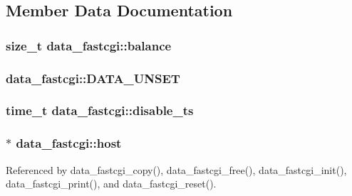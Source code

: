 \subsection{Member Data Documentation}
\hypertarget{structdata__fastcgi_ac4067fab3724bebefa875ef166c87d40}{
\subsubsection[{balance}]{\setlength{\rightskip}{0pt plus 5cm}size\-\_\-t data\-\_\-fastcgi\-::balance}}\label{structdata__fastcgi_ac4067fab3724bebefa875ef166c87d40}
\hypertarget{structdata__fastcgi_a5d6f1b6fd91e51aaf69a762ae91fc3a9}{
\subsubsection[{D\-A\-T\-A\-\_\-\-U\-N\-S\-E\-T}]{\setlength{\rightskip}{0pt plus 5cm}data\-\_\-fastcgi\-::\-D\-A\-T\-A\-\_\-\-U\-N\-S\-E\-T}}\label{structdata__fastcgi_a5d6f1b6fd91e51aaf69a762ae91fc3a9}
\hypertarget{structdata__fastcgi_a577cc4369a25513332564a46ba2657c7}{
\subsubsection[{disable\-\_\-ts}]{\setlength{\rightskip}{0pt plus 5cm}time\-\_\-t data\-\_\-fastcgi\-::disable\-\_\-ts}}\label{structdata__fastcgi_a577cc4369a25513332564a46ba2657c7}
\hypertarget{structdata__fastcgi_a7a9c24ab4f5ac9adad30f456386da83c}{
\subsubsection[{host}]{$\ast$ data\-\_\-fastcgi\-::host}}\label{structdata__fastcgi_a7a9c24ab4f5ac9adad30f456386da83c}


Referenced by data\-\_\-fastcgi\-\_\-copy(), data\-\_\-fastcgi\-\_\-free(), data\-\_\-fastcgi\-\_\-init(), data\-\_\-fastcgi\-\_\-print(), and data\-\_\-fastcgi\-\_\-reset().

